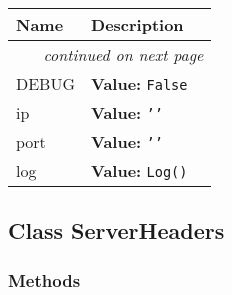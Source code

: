     \vspace{-1cm}
\hspace{\varindent}\begin{longtable}{|p{\varnamewidth}|p{\vardescrwidth}|l}
\cline{1-2}
\cline{1-2} \centering \textbf{Name} & \centering \textbf{Description}& \\
\cline{1-2}
\endhead\cline{1-2}\multicolumn{3}{r}{\small\textit{continued on next page}}\\\endfoot\cline{1-2}
\endlastfoot\raggedright D\-E\-B\-U\-G\- & \raggedright \textbf{Value:} 
{\tt False}&\\
\cline{1-2}
\raggedright i\-p\- & \raggedright \textbf{Value:} 
{\tt \texttt{'}\texttt{}\texttt{'}}&\\
\cline{1-2}
\raggedright p\-o\-r\-t\- & \raggedright \textbf{Value:} 
{\tt \texttt{'}\texttt{}\texttt{'}}&\\
\cline{1-2}
\raggedright l\-o\-g\- & \raggedright \textbf{Value:} 
{\tt Log()}&\\
\cline{1-2}
\end{longtable}



\subsection{Class ServerHeaders}

    \label{Headers:ServerHeaders}


  \subsubsection{Methods}

    \label{Headers:ServerHeaders:__init__}

